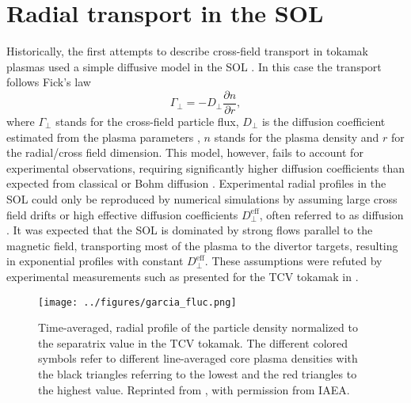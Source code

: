 \section{Radial transport in the SOL}
Historically, the first attempts to describe cross-field transport in tokamak plasmas
used a simple diffusive model in the SOL \cite{connor1999comparison}. In this case the
transport follows Fick's law
\begin{equation}
  \Gamma_\perp = - D_\perp \frac{\partial n}{\partial r},
\end{equation}
where $\Gamma_\perp$ stands for the cross-field particle flux, $D_\perp$ is the diffusion coefficient estimated from the plasma parameters \cite{Bohm1949}, $n$ stands for the plasma density and $r$ for the radial/cross field dimension. This model, however, fails to account for experimental observations, requiring significantly higher diffusion coefficients than expected from classical or Bohm diffusion \cite{lipschultz2002investigation,krasheninnikov2008recent}. Experimental radial profiles in the SOL could only be reproduced by numerical simulations by assuming large cross field drifts or high effective diffusion coefficients $D_\perp^\textrm{eff}$, often referred to as  diffusion \cite{wesson2011tokamaks}. It was expected that the SOL is dominated by strong flows parallel to the magnetic field, transporting most of the plasma to the divertor targets, resulting in exponential profiles with constant $D_\perp^\textrm{eff}$. These assumptions were refuted by experimental measurements such as presented for the TCV tokamak in .
\begin{figure}[t]
  \centering
  \texttt{[image: ../figures/garcia\_fluc.png]}
  \caption{Time-averaged, radial profile of the particle density normalized to the separatrix value in the TCV tokamak. The different colored symbols refer to different line-averaged core plasma densities with the black triangles referring to the lowest and the red triangles to the highest value. Reprinted from \cite{garcia2007fluctuations}, with permission from IAEA.}
  \label{Fig:garcia_fluc}
\end{figure}
